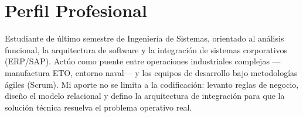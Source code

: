 \section{Perfil Profesional}

Estudiante de último semestre de Ingeniería de Sistemas, orientado al análisis
funcional, la arquitectura de software y la integración de sistemas corporativos
(ERP/SAP). Actúo como puente entre operaciones industriales complejas —manufactura
ETO, entorno naval— y los equipos de desarrollo bajo metodologías ágiles (Scrum).
Mi aporte no se limita a la codificación: levanto reglas de negocio, diseño el
modelo relacional y defino la arquitectura de integración para que la solución
técnica resuelva el problema operativo real.
